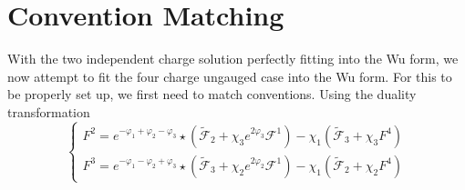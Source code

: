 \section{Convention Matching}
With the two independent charge solution perfectly fitting into the Wu form, we now attempt to fit the four charge ungauged case into the Wu form. For this to be properly set up, we first need to match conventions. Using the duality transformation 
\[\begin{cases}
	F^{2}=e^{-\varphi _1+\varphi _2-\varphi _3}\star(\tilde{\mathcal{F}}_{2}+\chi_3e^{2\varphi _3}\mathcal{F}^{1})-\chi_1(\tilde{\mathcal{F}}_{3}+\chi_3F^{4})\\
	F^{3}=e^{-\varphi _1-\varphi _2+\varphi _3}\star(\tilde{\mathcal{F}}_{3}+\chi_2e^{2\varphi _2}\mathcal{F}^{1})-\chi_1(\tilde{\mathcal{F}}_{2}+\chi_2F^{4})
\end{cases}\]
